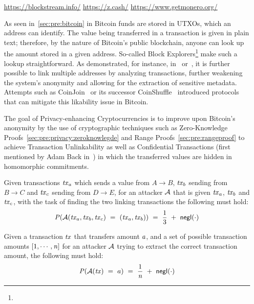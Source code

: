 \urldef\urlblockexp\url{https://blockstream.info/}
\urldef\urlzcash\url{https://z.cash/}
\urldef\urlmonero\url{https://www.getmonero.org/}

As seen in~\cref{sec:pre:bitcoin} in Bitcoin funds are stored in UTXOs, which an address can identify.
The value being transferred in a transaction is given in plain text; therefore, by the nature of Bitcoin’s public blockchain, anyone can look up the amount stored in a given address.
So-called Block Explorers\footnote{\urlblockexp} make such a lookup straightforward.
As demonstrated, for instance, in~\cite{barber2012bitter} or~\cite{reid2013analysis}, it is further possible to link multiple addresses by analyzing transactions, further weakening the system's anonymity and allowing for the extraction of sensitive metadata.
Attempts such as CoinJoin~\cite{maxwell2013coinjoin} or its successor CoinShuffle~\cite{ruffing2014coinshuffle} introduced protocols that can mitigate this likability issue in Bitcoin.

The goal of Privacy-enhancing Cryptocurrencies is to improve upon Bitcoin's anonymity by the use of cryptographic techniques such as Zero-Knowledge Proofs~\cref{sec:pre:privacy:zeroknowlegde} and Range Proofs~\cref{sec:pre:rangeproof} to achieve Transaction Unlinkability as well as Confidential Transactions (first mentioned by Adam Back in~\cite{back2013confidentialtx}) in which the transferred values are hidden in homomorphic commitments.

\begin{definition} \label{def:pre:privacy:tx-unlink}
    Given transactions $\mathit{tx}_a$ which sends a value from $A \rightarrow B$, $\mathit{tx}_b$ sending from $B \rightarrow C$ and $\mathit{tx}_c$ sending from $D \rightarrow E$, for an attacker $\mathcal{A}$ that is given $\mathit{tx}_a$, $\mathit{tx}_b$ and $\mathit{tx}_c$, with the task of finding the two linking transactions the following must hold:
    \[ \mathit{P}(\mathcal{A}(\mathit{tx}_a, \mathit{tx}_b, \mathit{tx}_c) ~=~ (\mathit{tx}_a, \mathit{tx}_b)) ~=~ \frac{1}{3} ~+~ \mathsf{negl}(\cdot)\]
\end{definition}

\begin{definition} \label{def:pre:privacy:conf-tx}
    Given a transaction $\mathit{tx}$ that transfers amount $a$, and a set of possible transaction amounts $[1,\cdots,\mathit{n}]$ for an attacker $\mathcal{A}$ trying to extract the correct transaction amount, the following must hold:
    \[ \mathit{P}(\mathcal{A}(\mathit{tx}) ~=~ a) ~=~ \frac{1}{\mathit{n}} ~+~ \mathsf{negl}(\cdot) \]
\end{definition}

